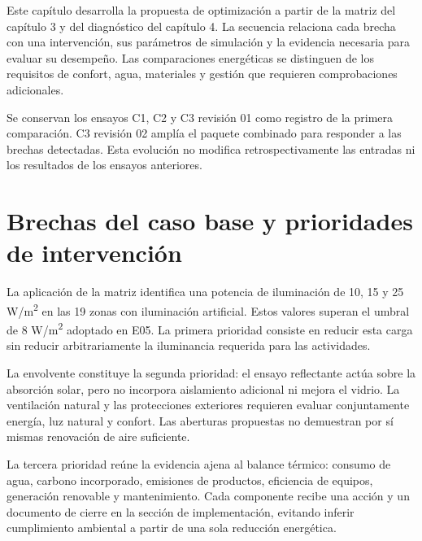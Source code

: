\begin{textoDosTercios}
Este capítulo desarrolla la propuesta de optimización a partir de la matriz del capítulo 3 y del diagnóstico del capítulo 4. La secuencia relaciona cada brecha con una intervención, sus parámetros de simulación y la evidencia necesaria para evaluar su desempeño. Las comparaciones energéticas se distinguen de los requisitos de confort, agua, materiales y gestión que requieren comprobaciones adicionales.

Se conservan los ensayos C1, C2 y C3 revisión 01 como registro de la primera comparación. C3 revisión 02 amplía el paquete combinado para responder a las brechas detectadas. Esta evolución no modifica retrospectivamente las entradas ni los resultados de los ensayos anteriores.
\end{textoDosTercios}

\section{Brechas del caso base y prioridades de intervención}
\begin{textoDosTercios}
La aplicación de la matriz identifica una potencia de iluminación de 10, 15 y 25 W/m\textsuperscript{2} en las 19 zonas con iluminación artificial. Estos valores superan el umbral de 8 W/m\textsuperscript{2} adoptado en E05. La primera prioridad consiste en reducir esta carga sin reducir arbitrariamente la iluminancia requerida para las actividades.

La envolvente constituye la segunda prioridad: el ensayo reflectante actúa sobre la absorción solar, pero no incorpora aislamiento adicional ni mejora el vidrio. La ventilación natural y las protecciones exteriores requieren evaluar conjuntamente energía, luz natural y confort. Las aberturas propuestas no demuestran por sí mismas renovación de aire suficiente.

La tercera prioridad reúne la evidencia ajena al balance térmico: consumo de agua, carbono incorporado, emisiones de productos, eficiencia de equipos, generación renovable y mantenimiento. Cada componente recibe una acción y un documento de cierre en la sección de implementación, evitando inferir cumplimiento ambiental a partir de una sola reducción energética.
\end{textoDosTercios}

